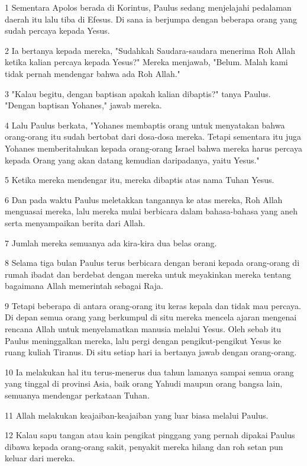 \par 1 Sementara Apolos berada di Korintus, Paulus sedang menjelajahi pedalaman daerah itu lalu tiba di Efesus. Di sana ia berjumpa dengan beberapa orang yang sudah percaya kepada Yesus.
\par 2 Ia bertanya kepada mereka, "Sudahkah Saudara-saudara menerima Roh Allah ketika kalian percaya kepada Yesus?" Mereka menjawab, "Belum. Malah kami tidak pernah mendengar bahwa ada Roh Allah."
\par 3 "Kalau begitu, dengan baptisan apakah kalian dibaptis?" tanya Paulus. "Dengan baptisan Yohanes," jawab mereka.
\par 4 Lalu Paulus berkata, "Yohanes membaptis orang untuk menyatakan bahwa orang-orang itu sudah bertobat dari dosa-dosa mereka. Tetapi sementara itu juga Yohanes memberitahukan kepada orang-orang Israel bahwa mereka harus percaya kepada Orang yang akan datang kemudian daripadanya, yaitu Yesus."
\par 5 Ketika mereka mendengar itu, mereka dibaptis atas nama Tuhan Yesus.
\par 6 Dan pada waktu Paulus meletakkan tangannya ke atas mereka, Roh Allah menguasai mereka, lalu mereka mulai berbicara dalam bahasa-bahasa yang aneh serta menyampaikan berita dari Allah.
\par 7 Jumlah mereka semuanya ada kira-kira dua belas orang.
\par 8 Selama tiga bulan Paulus terus berbicara dengan berani kepada orang-orang di rumah ibadat dan berdebat dengan mereka untuk meyakinkan mereka tentang bagaimana Allah memerintah sebagai Raja.
\par 9 Tetapi beberapa di antara orang-orang itu keras kepala dan tidak mau percaya. Di depan semua orang yang berkumpul di situ mereka mencela ajaran mengenai rencana Allah untuk menyelamatkan manusia melalui Yesus. Oleh sebab itu Paulus meninggalkan mereka, lalu pergi dengan pengikut-pengikut Yesus ke ruang kuliah Tiranus. Di situ setiap hari ia bertanya jawab dengan orang-orang.
\par 10 Ia melakukan hal itu terus-menerus dua tahun lamanya sampai semua orang yang tinggal di provinsi Asia, baik orang Yahudi maupun orang bangsa lain, semuanya mendengar perkataan Tuhan.
\par 11 Allah melakukan keajaiban-keajaiban yang luar biasa melalui Paulus.
\par 12 Kalau sapu tangan atau kain pengikat pinggang yang pernah dipakai Paulus dibawa kepada orang-orang sakit, penyakit mereka hilang dan roh setan pun keluar dari mereka.
